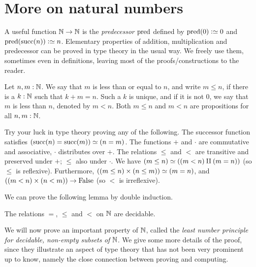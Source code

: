 \section{More on natural numbers}
\label{sec:more-on-N}

A useful function $\mathbb{N}\to\mathbb{N}$ is the \emph{predecessor} $\Pred$ defined by
$\Pred(0)\defeq 0$ and $\Pred(\Succ(n))\defeq n$.
Elementary properties of addition, multiplication and predecessor
can be proved in type theory in the usual way.
We freely use them, sometimes even in definitions, leaving most of the
proofs/constructions to the reader.

\begin{definition}
\label{def:orderonN}
Let $n,m:\mathbb{N}$. We say that $m$ is less than or equal to $n$, and write $m\leq n$,
if there is a $k:\mathbb{N}$ such that $k+m=n$. Such a $k$ is unique, and if it
is not $0$, we say that $m$ is less than $n$, denoted by $m<n$.
Both $m\leq n$ and $m<n$ are propositions for all $n,m:\mathbb{N}$.
\end{definition}

\begin{xca}\label{xca:try-your-luck-N}
Try your luck in type theory proving any of the following.
The successor function satisfies $(\Succ(n)=\Succ(m))\liff(n=m)$.
The functions $+$ and $\cdot$ are commutative and associative,
$\cdot$ distributes over $+$.
The relations $\leq$ and $<$ are transitive and
preserved under $+$; $\leq$ also under $\cdot$. 
We have $(m\leq n) \simeq ((m<n)\amalg(m=n))$ (so $\leq$ is reflexive).
Furthermore, $((m\leq n)\times (n\leq m)) \simeq (m=n)$,
and $((m<n)\times(n<m))\to\mathrm{False}$ (so $<$ is irreflexive).
\end{xca}

We can prove the following lemma by double induction.

\begin{lemma}\label{lem:dec-eq+order-N}
The relations $=$, $\leq$ and $<$ on $\mathbb{N}$ are decidable.
\end{lemma}

We will now prove an important property of $\mathbb{N}$, called the
\emph{least number principle for decidable, non-empty subsets of} $\mathbb{N}$.
We give some more details of the proof, since they illustrate an aspect
of type theory that has not been very prominent up to know, namely
the close connection between proving and computing.

